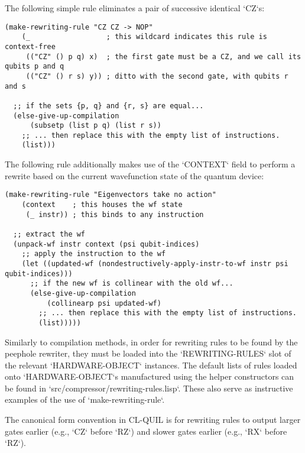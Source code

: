 \begin{example}
The following simple rule eliminates a pair of successive identical `CZ`s:
\begin{verbatim}
(make-rewriting-rule "CZ CZ -> NOP"
    (_                  ; this wildcard indicates this rule is context-free
     (("CZ" () p q) x)  ; the first gate must be a CZ, and we call its qubits p and q
     (("CZ" () r s) y)) ; ditto with the second gate, with qubits r and s

  ;; if the sets {p, q} and {r, s} are equal...
  (else-give-up-compilation
      (subsetp (list p q) (list r s))
    ;; ... then replace this with the empty list of instructions.
    (list)))
\end{verbatim}
\end{example}

\begin{example}
The following rule additionally makes use of the `CONTEXT` field to perform a rewrite based on the current wavefunction state of the quantum device:
\begin{verbatim}
(make-rewriting-rule "Eigenvectors take no action"
    (context    ; this houses the wf state
     (_ instr)) ; this binds to any instruction

  ;; extract the wf
  (unpack-wf instr context (psi qubit-indices)
    ;; apply the instruction to the wf
    (let ((updated-wf (nondestructively-apply-instr-to-wf instr psi qubit-indices)))
      ;; if the new wf is collinear with the old wf...
      (else-give-up-compilation
          (collinearp psi updated-wf)
        ;; ... then replace this with the empty list of instructions.
        (list)))))
\end{verbatim}
\end{example}

Similarly to compilation methods, in order for rewriting rules to be found by the peephole rewriter, they must be loaded into the `REWRITING-RULES` slot of the relevant `HARDWARE-OBJECT` instances.  The default lists of rules loaded onto `HARDWARE-OBJECT`s manufactured using the helper constructors can be found in `src/compressor/rewriting-rules.lisp`.  These also serve as instructive examples of the use of `make-rewriting-rule`.

\begin{remark}
The canonical form convention in CL-QUIL is for rewriting rules to output larger gates earlier (e.g., `CZ` before `RZ`) and slower gates earlier (e.g., `RX` before `RZ`).
\end{remark}
